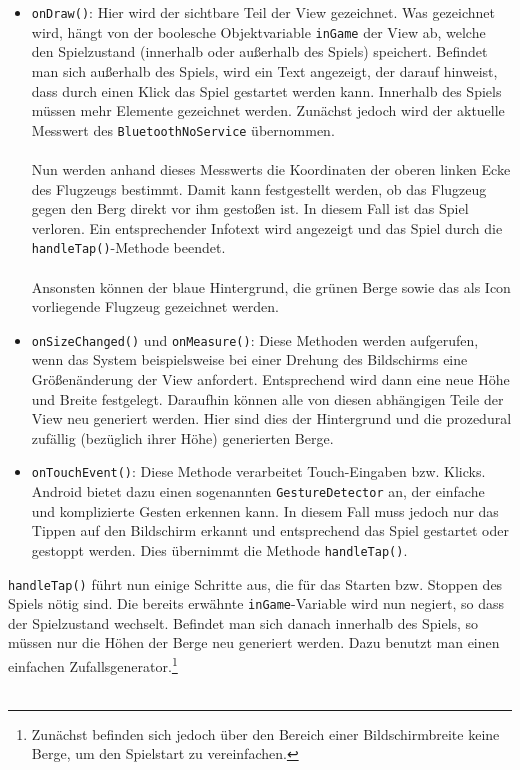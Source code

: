 \begin{itemize}
	\item \texttt{onDraw()}: Hier wird der sichtbare Teil der View gezeichnet.\cite{Src:CustomView} \cite{Src:AndroidKuenneth} Was gezeichnet wird, hängt von der boolesche Objektvariable \texttt{inGame} der View ab, welche den Spielzustand (innerhalb oder außerhalb des Spiels) speichert. Befindet man sich außerhalb des Spiels, wird ein Text angezeigt, der darauf hinweist, dass durch einen Klick das Spiel gestartet werden kann. Innerhalb des Spiels müssen mehr Elemente gezeichnet werden. Zunächst jedoch wird der aktuelle Messwert des \texttt{BluetoothNoService} übernommen. \\ \\
	Nun werden anhand dieses Messwerts die Koordinaten der oberen linken Ecke des Flugzeugs bestimmt. Damit kann festgestellt werden, ob das Flugzeug gegen den Berg direkt vor ihm gestoßen ist. In diesem Fall ist das Spiel verloren. Ein entsprechender Infotext wird angezeigt und das Spiel durch die \texttt{handleTap()}-Methode beendet. \\ \\
	Ansonsten können der blaue Hintergrund, die grünen Berge sowie das als Icon vorliegende Flugzeug gezeichnet werden.
	\item \texttt{onSizeChanged()} und \texttt{onMeasure()}: Diese Methoden werden aufgerufen, wenn das System beispielsweise bei einer Drehung des Bildschirms eine Größenänderung der View anfordert.\cite{Src:CustomView} Entsprechend wird dann eine neue Höhe und Breite festgelegt. Daraufhin können alle von diesen abhängigen Teile der View neu generiert werden. Hier sind dies der Hintergrund und die prozedural zufällig (bezüglich ihrer Höhe) generierten Berge.
	\item \texttt{onTouchEvent()}: Diese Methode verarbeitet Touch-Eingaben bzw. Klicks. \cite{Src:InteractiveView} Android bietet dazu einen sogenannten \texttt{GestureDetector} an, der einfache und komplizierte Gesten erkennen kann. In diesem Fall muss jedoch nur das Tippen auf den Bildschirm erkannt und entsprechend das Spiel gestartet oder gestoppt werden. Dies übernimmt die Methode \texttt{handleTap()}.
\end{itemize}
\texttt{handleTap()} führt nun einige Schritte aus, die für das Starten bzw. Stoppen des Spiels nötig sind. Die bereits erwähnte \texttt{inGame}-Variable wird nun negiert, so dass der Spielzustand wechselt. Befindet man sich danach innerhalb des Spiels, so müssen nur die Höhen der Berge neu generiert werden. Dazu benutzt man einen einfachen Zufallsgenerator.\footnote{Zunächst befinden sich jedoch über den Bereich einer Bildschirmbreite keine Berge, um den Spielstart zu vereinfachen.} \\ \\
